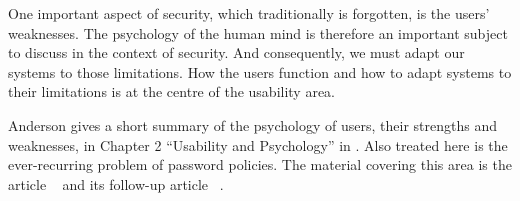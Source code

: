 One important aspect of security, which traditionally is forgotten, is the 
users' weaknesses.
The psychology of the human mind is therefore an important subject to discuss 
in the context of security.
And consequently, we must adapt our systems to those limitations.
How the users function and how to adapt systems to their limitations is at the 
centre of the usability area.

Anderson gives a short summary of the psychology of users, their strengths and 
weaknesses, in Chapter 2 ``Usability and Psychology'' in 
\cite{Anderson2008sea}.
Also treated here is the ever-recurring problem of password policies.
The material covering this area is the article 
~\cite{Komanduri2011opa} and its follow-up article 
~\cite{Komanduri2014can}.
